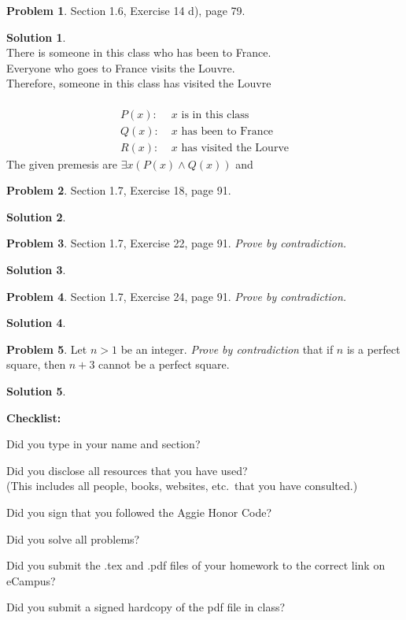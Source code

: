 \documentclass{article}
\theoremstyle{definition}
\newtheorem{problem}{Problem}
\newtheorem*{solution}{Solution}
\newcommand{\checklist}{\noindent\textbf{Checklist:}
\begin{compactitem}[$\Box$] 
\item Did you type in your name and section? 
\item Did you disclose all resources that you have used? \\
(This includes all people, books, websites, etc.\ that you have consulted.)
\item Did you sign that you followed the Aggie Honor Code? 
\item Did you solve all problems? 
\item Did you submit the .tex and .pdf files of your homework to the correct link on eCampus?
\item Did you submit a signed hardcopy of the pdf file in class? 
\end{compactitem}
}
\begin{document}
\begin{problem} Section 1.6, Exercise 14 d), page 79.  
\end{problem}
\begin{solution}\ \\
There is someone in this class who has been to France. \\
Everyone who goes to France visits the Louvre. \\
Therefore, someone in this class has visited the Louvre \\ \ \\
\begin{align*}
  P(x):&\; x \text{ is in this class} \\
  Q(x):&\; x \text{ has been to France} \\
  R(x):&\; x \text{ has visited the Lourve}
\end{align*}
The given premesis are $\exists x(P(x) \land Q(x))$ and 

\end{solution}

\begin{problem} Section 1.7, Exercise 18, page 91.
\end{problem}
\begin{solution}
\end{solution}

\begin{problem} Section 1.7, Exercise 22, page 91.  \textsl{Prove by contradiction.}
\end{problem}
\begin{solution}
\end{solution}

\begin{problem} Section 1.7, Exercise 24, page 91.  \textsl{Prove by contradiction.}
\end{problem}
\begin{solution}
\end{solution}

\begin{problem} Let $n>1$ be an integer. \textsl{Prove by contradiction} that 
if $n$ is a perfect square, then $n+3$ cannot be a perfect square. 
\end{problem}
\begin{solution}
\end{solution}

\goodbreak
\checklist
\end{document}
